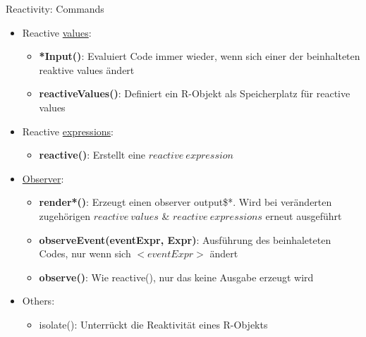 \documentclass[xcolor=dvipsnames]{beamer}\usepackage[]{graphicx}\usepackage[]{color}
\begin{document}
\begin{frame}[fragile]{Reactivity: Commands}  
  \begin{itemize}
  \item Reactive \underline{values}:
    \begin{itemize}
      \item \textbf{*Input({})}: Evaluiert Code immer wieder, wenn sich einer der beinhalteten reaktive values ändert
      \item \textbf{reactiveValues()}: Definiert ein R-Objekt als Speicherplatz für reactive values
    \end{itemize}  
  \item Reactive \underline{expressions}:
    \begin{itemize}
      \item \textbf{reactive({})}: Erstellt eine $reactive~expression$  
    \end{itemize}
  \item \underline{Observer}:
    \begin{itemize}
      \item \textbf{render*({})}: Erzeugt einen observer output\$*. Wird bei veränderten zugehörigen $reactive~values$ \& $reactive~expressions$ erneut ausgeführt
      \item \textbf{observeEvent(eventExpr, Expr)}: Ausführung des beinhaleteten Codes, nur wenn sich $<eventExpr>$ ändert
      \item \textbf{observe()}: Wie reactive(), nur das keine Ausgabe erzeugt wird
    \end{itemize}
  \item Others:
    \begin{itemize}
      \item isolate(): Unterrückt die Reaktivität eines R-Objekts
    \end{itemize}
 \end{itemize}
\end{frame}
\end{document}
